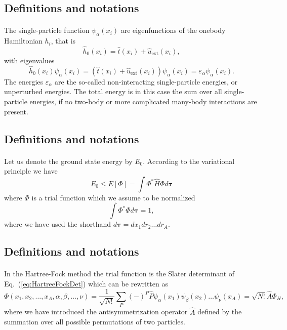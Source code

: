 \documentclass[%
twoside,                 %
final,                   %
10pt]{article}
\begin{document}
\subsection*{Definitions and notations}

\paragraph{}
The single-particle function $\psi_{\alpha}(x_i)$  are eigenfunctions of the onebody
Hamiltonian $h_i$, that is
\[
\hat{h}_0(x_i)=\hat{t}(x_i) + \hat{u}_{\mathrm{ext}}(x_i),
\]
with eigenvalues 
\[
\hat{h}_0(x_i) \psi_{\alpha}(x_i)=\left(\hat{t}(x_i) + \hat{u}_{\mathrm{ext}}(x_i)\right)\psi_{\alpha}(x_i)=\varepsilon_{\alpha}\psi_{\alpha}(x_i).
\]
The energies $\varepsilon_{\alpha}$ are the so-called non-interacting single-particle energies, or unperturbed energies. 
The total energy is in this case the sum over all  single-particle energies, if no two-body or more complicated
many-body interactions are present.



\subsection*{Definitions and notations}

\paragraph{}
Let us denote the ground state energy by $E_0$. According to the
variational principle we have
\[
  E_0 \le E[\Phi] = \int \Phi^*\hat{H}\Phi d\mathbf{\tau}
\]
where $\Phi$ is a trial function which we assume to be normalized
\[
  \int \Phi^*\Phi d\mathbf{\tau} = 1,
\]
where we have used the shorthand $d\mathbf{\tau}=dx_1dr_2\dots dr_A$.



\subsection*{Definitions and notations}

\paragraph{}
In the Hartree-Fock method the trial function is the Slater
determinant of Eq.~(\ref{eq:HartreeFockDet}) which can be rewritten as 
\[
  \Phi(x_1,x_2,\dots,x_A,\alpha,\beta,\dots,\nu) = \frac{1}{\sqrt{N!}}\sum_{P} (-)^P\hat{P}\psi_{\alpha}(x_1)
    \psi_{\beta}(x_2)\dots\psi_{\nu}(x_A)=\sqrt{N!}\hat{A}\Phi_H,
\]
where we have introduced the antisymmetrization operator $\hat{A}$ defined by the 
summation over all possible permutations of two particles.
\end{document}
